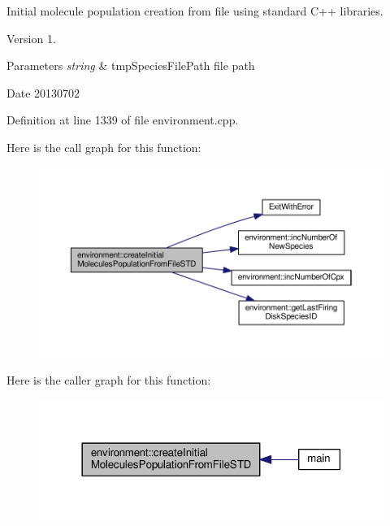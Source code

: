 Initial molecule population creation from file using standard C++ libraries. 

\begin{DoxyVersion}{Version}
1. 
\end{DoxyVersion}

\begin{DoxyParams}{Parameters}
{\em string} & tmp\-Species\-File\-Path file path \\
\hline
\end{DoxyParams}
\begin{DoxyDate}{Date}
20130702 
\end{DoxyDate}


Definition at line 1339 of file environment.\-cpp.



Here is the call graph for this function\-:\nopagebreak
\begin{figure}[H]
\begin{center}
\leavevmode
\includegraphics[width=350pt]{a00011_af6db92c710f2588ba7dff1165e26d538_cgraph}
\end{center}
\end{figure}




Here is the caller graph for this function\-:\nopagebreak
\begin{figure}[H]
\begin{center}
\leavevmode
\includegraphics[width=318pt]{a00011_af6db92c710f2588ba7dff1165e26d538_icgraph}
\end{center}
\end{figure}


